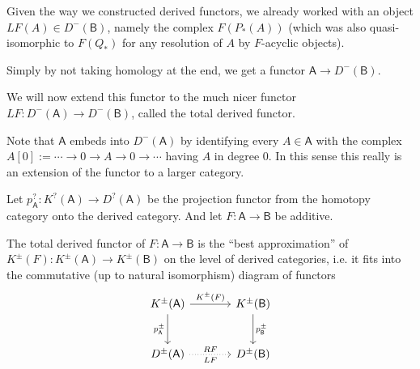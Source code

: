 \documentclass[fontsize=11pt,fleqn,a4paper]{scrartcl}
\begin{document}
\begin{remark}
Given the way we constructed derived functors, we already worked with an object $LF(A)\in D^-(\mathsf{B})$, namely the complex $F(P_\ast(A))$ (which was also quasi-isomorphic to $F(Q_\ast)$ for any resolution of $A$ by $F$-acyclic objects).

Simply by not taking homology at the end, we get a functor $\mathsf{A} \to D^-(\mathsf{B})$.

We will now extend this functor to the much nicer functor $LF: D^-(\mathsf{A}) \to D^-(\mathsf{B})$, called the total derived functor.

Note that $\mathsf{A}$ embeds into $D^-(\mathsf{A})$ by identifying every $A\in\mathsf{A}$ with the complex $A[0] := \cdots \to 0 \to A\to 0\to\cdots$ having $A$ in degree $0$. In this sense this really is an extension of the functor to a larger category.
\end{remark}

\begin{definition}
Let $p_\mathsf{A}^?: K^?(\mathsf{A}) \to D^?(\mathsf{A})$ be the projection functor from the homotopy category onto the derived category. And let $F:\mathsf{A}\to\mathsf{B}$ be additive.

The total derived functor of $F:\mathsf{A}\to\mathsf{B}$ is the \enquote{best approximation} of $K^\pm(F): K^\pm(\mathsf{A}) \to K^\pm(\mathsf{B})$ on the level of derived categories, i.e. it fits into the commutative (up to natural isomorphism) diagram of functors
\[\begin{tikzcd}[sep = large]
K^{\pm}(\mathsf{A}) \ar[r,"K^\pm(F)"] \ar[d,"p_\mathsf{A}^\pm"'] & K^{\pm}(\mathsf{B}) \ar[d,"p_\mathsf{B}^\pm"] \\
D^\pm(\mathsf{A}) \ar[r,dotted,"LF"',"RF"] & D^\pm(\mathsf{B})
\end{tikzcd}\]
\end{definition}
\end{document}
